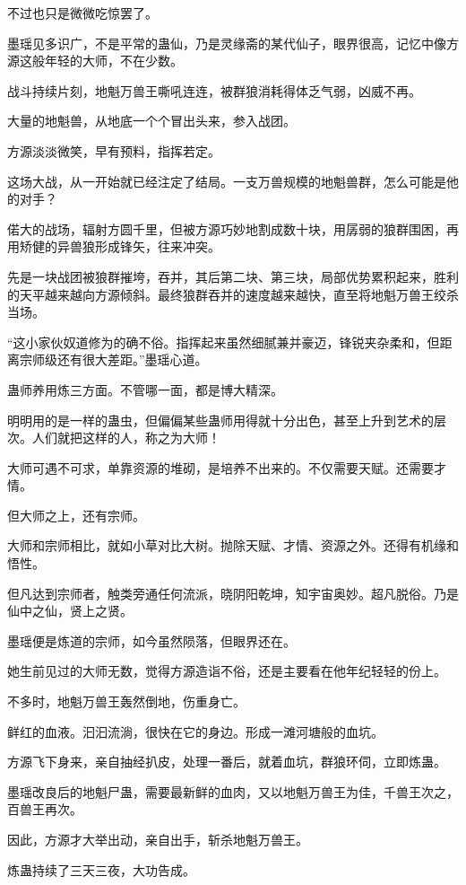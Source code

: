 \begin{this_body}
不过也只是微微吃惊罢了。

墨瑶见多识广，不是平常的蛊仙，乃是灵缘斋的某代仙子，眼界很高，记忆中像方源这般年轻的大师，不在少数。

战斗持续片刻，地魁万兽王嘶吼连连，被群狼消耗得体乏气弱，凶威不再。

大量的地魁兽，从地底一个个冒出头来，参入战团。

方源淡淡微笑，早有预料，指挥若定。

这场大战，从一开始就已经注定了结局。一支万兽规模的地魁兽群，怎么可能是他的对手？

偌大的战场，辐射方圆千里，但被方源巧妙地割成数十块，用孱弱的狼群围困，再用矫健的异兽狼形成锋矢，往来冲突。

先是一块战团被狼群摧垮，吞并，其后第二块、第三块，局部优势累积起来，胜利的天平越来越向方源倾斜。最终狼群吞并的速度越来越快，直至将地魁万兽王绞杀当场。

“这小家伙奴道修为的确不俗。指挥起来虽然细腻兼并豪迈，锋锐夹杂柔和，但距离宗师级还有很大差距。”墨瑶心道。

蛊师养用炼三方面。不管哪一面，都是博大精深。

明明用的是一样的蛊虫，但偏偏某些蛊师用得就十分出色，甚至上升到艺术的层次。人们就把这样的人，称之为大师！

大师可遇不可求，单靠资源的堆砌，是培养不出来的。不仅需要天赋。还需要才情。

但大师之上，还有宗师。

大师和宗师相比，就如小草对比大树。抛除天赋、才情、资源之外。还得有机缘和悟性。

但凡达到宗师者，触类旁通任何流派，晓阴阳乾坤，知宇宙奥妙。超凡脱俗。乃是仙中之仙，贤上之贤。

墨瑶便是炼道的宗师，如今虽然陨落，但眼界还在。

她生前见过的大师无数，觉得方源造诣不俗，还是主要看在他年纪轻轻的份上。

不多时，地魁万兽王轰然倒地，伤重身亡。

鲜红的血液。汩汩流淌，很快在它的身边。形成一滩河塘般的血坑。

方源飞下身来，亲自抽经扒皮，处理一番后，就着血坑，群狼环伺，立即炼蛊。

墨瑶改良后的地魁尸蛊，需要最新鲜的血肉，又以地魁万兽王为佳，千兽王次之，百兽王再次。

因此，方源才大举出动，亲自出手，斩杀地魁万兽王。

炼蛊持续了三天三夜，大功告成。


\end{this_body}
